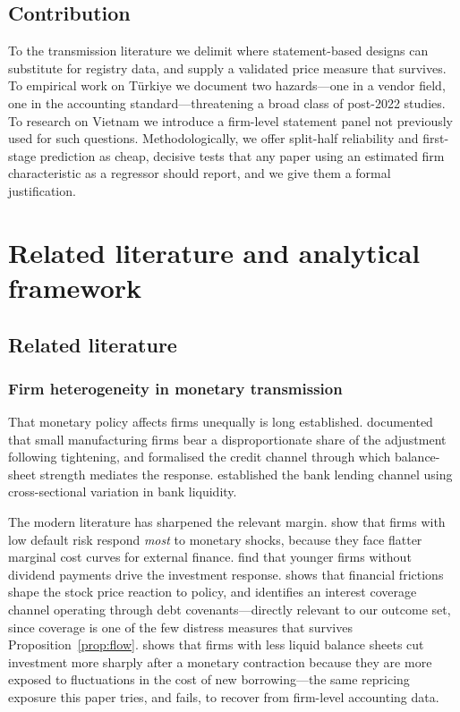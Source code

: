 \documentclass[review,12pt,authoryear]{elsarticle}
\theoremstyle{plain}
\theoremstyle{definition}
\begin{document}
\subsection{Contribution}

To the transmission literature we delimit where statement-based designs can
substitute for registry data, and supply a validated price measure that
survives. To empirical work on T\"{u}rkiye we document two hazards---one in a
vendor field, one in the accounting standard---threatening a broad class of
post-2022 studies. To research on Vietnam we introduce a firm-level statement
panel not previously used for such questions. Methodologically, we offer
split-half reliability and first-stage prediction as cheap, decisive tests that
any paper using an estimated firm characteristic as a regressor should report,
and we give them a formal justification.

\section{Related literature and analytical framework}
\label{sec:lit}

\subsection{Related literature}
\label{sec:relatedlit}


\subsubsection{Firm heterogeneity in monetary transmission}

That monetary policy affects firms unequally is long established.
\citet{gertler1994} documented that small manufacturing firms bear a
disproportionate share of the adjustment following tightening, and
\citet{bernanke1995} formalised the credit channel through which balance-sheet
strength mediates the response. \citet{kashyap2000} established the bank lending
channel using cross-sectional variation in bank liquidity.

The modern literature has sharpened the relevant margin. \citet{ottonello2020}
show that firms with low default risk respond \emph{most} to monetary shocks,
because they face flatter marginal cost curves for external finance.
\citet{cloyne2023} find that younger firms without dividend payments drive the
investment response. \citet{ozdagli2018} shows that financial frictions shape
the stock price reaction to policy, and \citet{greenwald2019} identifies an
interest coverage channel operating through debt covenants---directly relevant
to our outcome set, since coverage is one of the few distress measures that
survives Proposition~\ref{prop:flow}. \citet{jeenas2019} shows that firms with
less liquid balance sheets cut investment more sharply after a monetary
contraction because they are more exposed to fluctuations in the cost of new
borrowing---the same repricing exposure this paper tries, and fails, to recover
from firm-level accounting data.
\end{document}

